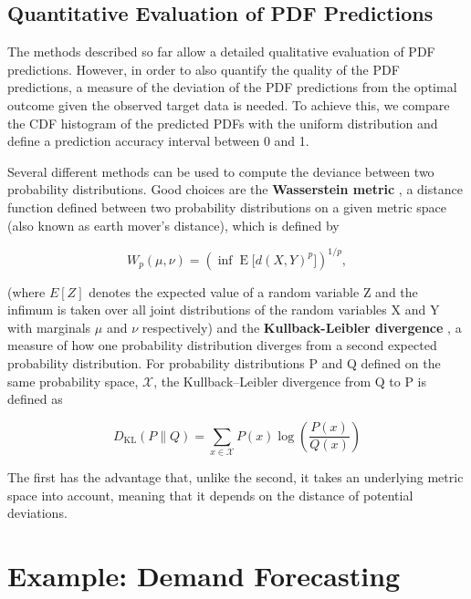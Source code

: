 \documentclass[BCOR=1mm, DIV=calc,10pt,
twoside=true,
twocolumn,
headings=normal]{scrartcl}
\begin{document}
\subsection{Quantitative Evaluation of PDF Predictions}

The methods described so far allow a detailed qualitative evaluation of PDF predictions. However, in order to also quantify the quality of the PDF predictions, a measure of the deviation of the PDF predictions from the optimal outcome given the observed target data is needed. To achieve this, we compare the CDF histogram of the predicted PDFs with the uniform distribution and define a prediction accuracy interval between 0 and 1.

Several different methods can be used to compute the deviance between two probability distributions. Good choices are the \textbf{Wasserstein metric} \cite{olkin1982}, a distance function defined between two probability distributions on a given metric space (also known as earth mover’s distance), which is defined by

\begin{equation}
{\displaystyle W_{p}(\mu ,\nu)=\left(\inf \operatorname {E} {\big [}d(X,Y)^{p}{\big ]}\right)^{1/p},}
\end{equation}

(where ${{E}[Z]}$ denotes the expected value of a random variable Z and the infimum is taken over all joint distributions of the random variables X and Y with marginals ${\mu}$ and ${\nu}$  respectively) and the \textbf{Kullback-Leibler divergence} \cite{kullback1951}, a measure of how one probability distribution diverges from a second expected probability distribution. For  probability distributions P and Q defined on the same probability space, ${\displaystyle {\mathcal {X}}}$, the Kullback–Leibler divergence from Q to P is defined as

\begin{equation}
{\displaystyle D_{\text{KL}}(P\parallel Q)=\sum _{x\in {\mathcal {X}}}P(x)\log \left({\frac {P(x)}{Q(x)}}\right)}
\end{equation}

The first has the advantage that, unlike the second, it takes an underlying metric space into account, meaning that it depends on the distance of potential deviations.



\section{Example: Demand Forecasting}
\label{sec:example}
\end{document}
